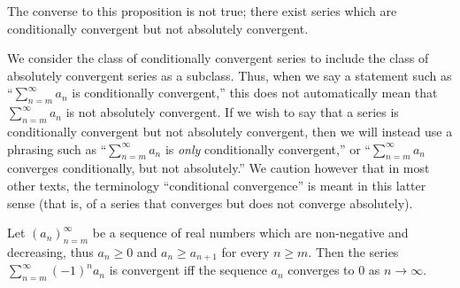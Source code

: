 \begin{rmk}\label{i:7.2.10}
  The converse to this proposition is not true;
  there exist series which are conditionally convergent but not absolutely convergent.
\end{rmk}

\begin{rmk}\label{i:7.2.11}
  We consider the class of conditionally convergent series to include the class of absolutely convergent series as a subclass.
  Thus, when we say a statement such as ``\(\sum_{n = m}^\infty a_n\) is conditionally convergent,'' this does not automatically mean that \(\sum_{n = m}^\infty a_n\) is not absolutely convergent.
  If we wish to say that a series is conditionally convergent but not absolutely convergent, then we will instead use a phrasing such as ``\(\sum_{n = m}^\infty a_n\) is \emph{only} conditionally convergent,'' or ``\(\sum_{n = m}^\infty a_n\) converges conditionally, but not absolutely.''
  We caution however that in most other texts, the terminology ``conditional convergence'' is meant in this latter sense
  (that is, of a series that converges but does not converge absolutely).
\end{rmk}

\begin{prop}\label{i:7.2.12}
  Let \((a_n)_{n = m}^\infty\) be a sequence of real numbers which are non-negative and decreasing, thus \(a_n \geq 0\) and \(a_n \geq a_{n + 1}\) for every \(n \geq m\).
  Then the series \(\sum_{n = m}^\infty (-1)^n a_n\) is convergent iff the sequence \(a_n\) converges to \(0\) as \(n \to \infty\).
\end{prop}


